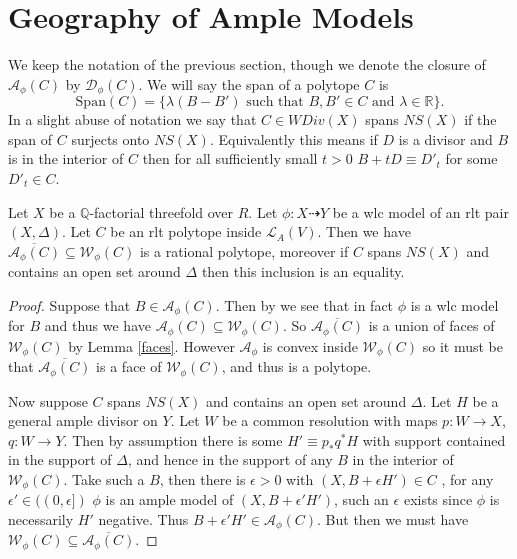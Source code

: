 \documentclass[a4paper,12pt]{amsart}
\begin{document}
	\section{Geography of Ample Models}
	
	We keep the notation of the previous section, though we denote the closure of $\mathcal{A}_{\phi}(C)$ by $\mathcal{D}_{\phi}(C)$. We will say the span of a polytope $C$ is $$\text{Span}(C)=\{\lambda(B-B') \text{ such that } B, B' \in C \text{ and } \lambda \in \mathbb{R}\}.$$  In a slight abuse of notation we say that $C \in WDiv(X)$ spans $NS(X)$ if the span of $C$ surjects onto $NS(X)$. Equivalently this means if $D$ is a divisor and $B$ is in the interior of $C$ then for all sufficiently small $t>0$ $B+tD\equiv D'_{t}$ for some $D'_{t}\in C$.
		
	\begin{lemma}\label{close}
		Let $X$ be a $\mathbb{Q}$-factorial threefold over $R$. Let $\phi:X \dashrightarrow Y$ be a wlc model of an rlt pair $(X,\Delta)$. Let $C$ be an rlt polytope inside $\mathcal{L}_{A}(V)$. Then we have $\overline{\mathcal{A}_{\phi}(C)} \subseteq \mathcal{W}_{\phi}(C)$ is a rational polytope, moreover if $C$ spans $NS(X)$ and contains an open set around $\Delta$ then this inclusion is an equality.
	\end{lemma}
	
	\begin{proof}
		Suppose that $B \in \mathcal{A}_{\phi}(C)$. Then by \cite[Theorem 3.6.5]{birkar2010existence} we see that in fact $\phi$ is a wlc model for $B$ and thus we have $\mathcal{A}_{\phi}(C) \subseteq \mathcal{W}_{\phi}(C)$. So $\overline{\mathcal{A}_{\phi}(C)}$ is a union of faces of $\mathcal{W}_{\phi}(C)$ by Lemma \ref{faces}. However $\mathcal{A}_{\phi}$ is convex inside $\mathcal{W}_{\phi}(C)$ so it must be that $\overline{\mathcal{A}_{\phi}(C)}$ is a face of $\mathcal{W}_{\phi}(C)$, and thus is a polytope.
		
		Now suppose $C$ spans $NS(X)$ and contains an open set around $\Delta$.
		Let $H$ be a general ample divisor on $Y$. Let $W$ be a common resolution with maps $p:W \to X$, $q:W \to Y$. Then by assumption there is some $H' \equiv p_{*}q^{*}H$ with support contained in the support of $\Delta$, and hence in the support of any $B$ in the interior of $\mathcal{W}_{\phi}(C)$. Take such a $B$, then there is $\epsilon >0$ with $(X,B+\epsilon H') \in C$ , for any $\epsilon' \in ((0,\epsilon])$ $\phi$ is an ample model of $(X,B+ \epsilon' H')$, such an $\epsilon$ exists since $\phi$ is necessarily $H'$ negative. Thus $B+\epsilon' H' \in \mathcal{A}_{\phi}(C)$. But then we must have $\mathcal{W}_{\phi}(C)\subseteq \overline{\mathcal{A}_{\phi}(C)}$.
	\end{proof}
	
\end{document}
